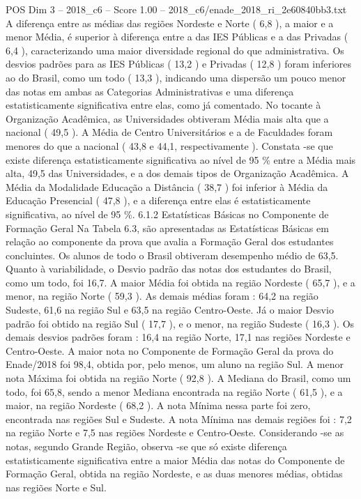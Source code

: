 \begin{textsample}{POS Dim 3 – 2018\_c6 – Score 1.00 – 2018\_c6/enade\_2018\_ri\_2e60840bb3.txt}
A diferença entre as médias das regiões Nordeste e Norte ( 6,8 ), a maior e a menor Média, é superior à diferença entre a das IES Públicas e a das Privadas ( 6,4 ), caracterizando uma maior diversidade regional do que administrativa.
Os desvios padrões para as IES Públicas ( 13,2 ) e Privadas ( 12,8 ) foram inferiores ao do Brasil, como um todo ( 13,3 ), indicando uma dispersão um pouco menor das notas em ambas as Categorias Administrativas e uma diferença estatisticamente significativa entre elas, como já comentado.
No tocante à Organização Acadêmica, as Universidades obtiveram Média mais alta que a nacional ( 49,5 ).
A Média de Centro Universitários e a de Faculdades foram menores do que a nacional ( 43,8 e 44,1, respectivamente ).
Constata -se que existe diferença estatisticamente significativa ao nível de 95 \% entre a Média mais alta, 49,5 das Universidades, e a dos demais tipos de Organização Acadêmica.
A Média da Modalidade Educação a Distância ( 38,7 ) foi inferior à Média da Educação Presencial ( 47,8 ), e a diferença entre elas é estatisticamente significativa, ao nível de 95 \%. 6.1.2 Estatísticas Básicas no Componente de Formação Geral Na Tabela 6.3, são apresentadas as Estatísticas Básicas em relação ao componente da prova que avalia a Formação Geral dos estudantes concluintes.
Os alunos de todo o Brasil obtiveram desempenho médio de 63,5.
Quanto à variabilidade, o Desvio padrão das notas dos estudantes do Brasil, como um todo, foi 16,7.
A maior Média foi obtida na região Nordeste ( 65,7 ), e a menor, na região Norte ( 59,3 ).
As demais médias foram : 64,2 na região Sudeste, 61,6 na região Sul e 63,5 na região Centro-Oeste.
Já o maior Desvio padrão foi obtido na região Sul ( 17,7 ), e o menor, na região Sudeste ( 16,3 ).
Os demais desvios padrões foram : 16,4 na região Norte, 17,1 nas regiões Nordeste e Centro-Oeste.
A maior nota no Componente de Formação Geral da prova do Enade/2018 foi 98,4, obtida por, pelo menos, um aluno na região Sul.
A menor nota Máxima foi obtida na região Norte ( 92,8 ).
A Mediana do Brasil, como um todo, foi 65,8, sendo a menor Mediana encontrada na região Norte ( 61,5 ), e a maior, na região Nordeste ( 68,2 ).
A nota Mínima nessa parte foi zero, encontrada nas regiões Sul e Sudeste.
A nota Mínima nas demais regiões foi : 7,2 na região Norte e 7,5 nas regiões Nordeste e Centro-Oeste.
Considerando -se as notas, segundo Grande Região, observa -se que só existe diferença estatisticamente significativa entre a maior Média das notas do Componente de Formação Geral, obtida na região Nordeste, e as duas menores médias, obtidas nas regiões Norte e Sul.

\end{textsample}
